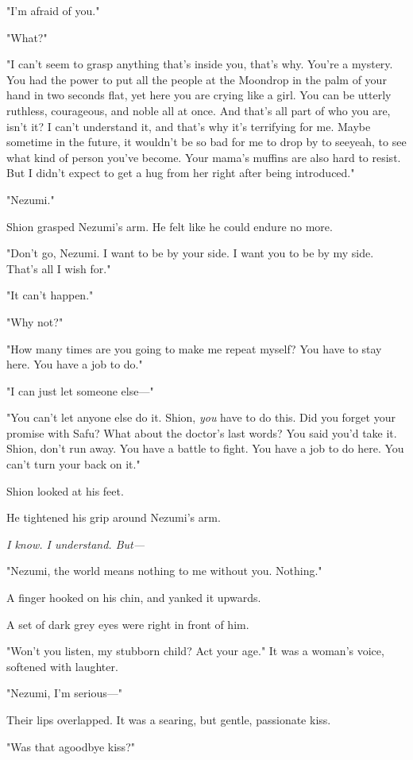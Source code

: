 "I'm afraid of you."

"What?"

"I can't seem to grasp anything that's inside you, that's why. You're a
mystery. You had the power to put all the people at the Moondrop in the
palm of your hand in two seconds flat, yet here you are crying like a
girl. You can be utterly ruthless, courageous, and noble all at once.
And that's all part of who you are, isn't it? I can't understand it, and
that's why it's terrifying for me. Maybe sometime in the future, it
wouldn't be so bad for me to drop by to see\el yeah, to see what kind of
person you've become. Your mama's muffins are also hard to resist. But I
didn't expect to get a hug from her right after being introduced."

"Nezumi."

Shion grasped Nezumi's arm. He felt like he could endure no more.

"Don't go, Nezumi. I want to be by your side. I want you to be by my
side. That's all I wish for."

"It can't happen."

"Why not?"

"How many times are you going to make me repeat myself? You have to stay
here. You have a job to do."

"I can just let someone else---"

"You can't let anyone else do it. Shion, \emph{you} have to do this. Did you
forget your promise with Safu? What about the doctor's last words? You
said you'd take it. Shion, don't run away. You have a battle to fight.
You have a job to do here. You can't turn your back on it."

Shion looked at his feet.

He tightened his grip around Nezumi's arm.

\emph{I know. I understand. But---}

"Nezumi, the world means nothing to me without you. Nothing."

A finger hooked on his chin, and yanked it upwards.

A set of dark grey eyes were right in front of him.

"Won't you listen, my stubborn child? Act your age." It was a woman's
voice, softened with laughter.

"Nezumi, I'm serious---"

Their lips overlapped. It was a searing, but gentle, passionate kiss.

"Was that a\el goodbye kiss?"

